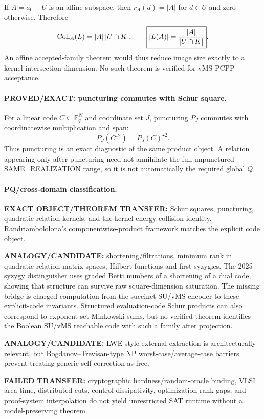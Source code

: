 \documentclass[11pt]{article}
\begin{document}
If \(A=a_0+U\) is an affine subspace, then \(r_A(d)=|A|\) for \(d\in U\) and zero otherwise. Therefore
\[
\operatorname{Coll}_A(L)=|A|\,|U\cap K|,
\qquad
\boxed{|L(A)|={|A|\over |U\cap K|}}.
\]
An affine accepted-family theorem would thus reduce image size exactly to a kernel-intersection dimension. No such theorem is verified for vMS PCPP acceptance.

\paragraph{PROVED/EXACT: puncturing commutes with Schur square.}
For a linear code \(C\subseteq\mathbb F_q^N\) and coordinate set \(J\), puncturing \(P_J\) commutes with coordinatewise multiplication and span:
\[
\boxed{P_J(C^{\star2})=P_J(C)^{\star2}}.
\]
Thus puncturing is an exact diagnostic of the same product object. A relation appearing only after puncturing need not annihilate the full unpunctured SAME\_REALIZATION range, so it is not automatically the required global \(Q\).

\paragraph{PQ/cross-domain classification.}
\textbf{EXACT OBJECT/THEOREM TRANSFER:} Schur squares, puncturing, quadratic-relation kernels, and the kernel-energy collision identity. Randriambololona's componentwise-product framework matches the explicit code object.

\textbf{ANALOGY/CANDIDATE:} shortening/filtrations, minimum rank in quadratic-relation matrix spaces, Hilbert functions and first syzygies. The 2025 syzygy distinguisher uses graded Betti numbers of a shortening of a dual code, showing that structure can survive raw square-dimension saturation. The missing bridge is charged computation from the succinct SU/vMS encoder to these explicit-code invariants. Structured evaluation-code Schur products can also correspond to exponent-set Minkowski sums, but no verified theorem identifies the Boolean SU/vMS reachable code with such a family after projection.

\textbf{ANALOGY/CANDIDATE:} LWE-style external extraction is architecturally relevant, but Bogdanov--Trevisan-type NP worst-case/average-case barriers prevent treating generic self-correction as free.

\textbf{FAILED TRANSFER:} cryptographic hardness/random-oracle binding, VLSI area-time, distributed cuts, control dissipativity, optimization rank gaps, and proof-system interpolation do not yield unrestricted SAT runtime without a model-preserving theorem.
\end{document}
